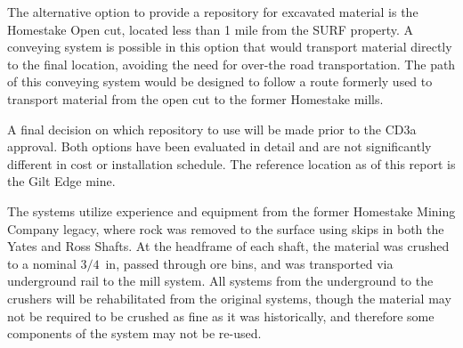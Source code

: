 The alternative option to provide a repository for excavated material is the Homestake Open cut, located less than 1 mile from the SURF property.  A conveying system is possible in this option that would transport material directly to the final location, avoiding the need for over-the road transportation.  The path of this conveying system would be designed to follow a route formerly used to transport material from the open cut to the former Homestake mills.

A final decision on which repository to use will be made prior to the CD3a approval.  Both options have been evaluated in detail and are not significantly different in cost or installation schedule.  The reference location as of this report is the Gilt Edge mine.

The systems utilize experience and equipment from the former Homestake Mining Company legacy, where rock was removed to the surface using skips in both the Yates and Ross Shafts. At the headframe of each shaft, the material was crushed to a nominal $3/4$~in, passed through ore bins, and was transported via underground rail to the mill system. All systems from the underground to the crushers will be rehabilitated from the original systems, though the material may not be required to be crushed as fine as it was historically, and therefore some components of the system may not be re-used.





